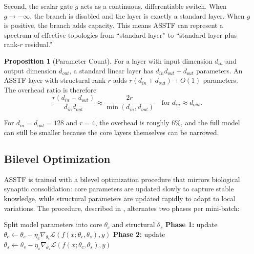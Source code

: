 \documentclass[11pt,a4paper]{article}
\theoremstyle{definition}
\newtheorem{proposition}{Proposition}[section]
\begin{document}
Second, the scalar gate $g$ acts as a continuous, differentiable switch. When $g \to -\infty$, the branch is disabled and the layer is exactly a standard layer. When $g$ is positive, the branch adds capacity. This means ASSTF can represent a spectrum of effective topologies from ``standard layer'' to ``standard layer plus rank-$r$ residual.''

\begin{proposition}[Parameter Count]
    \label{prop:params}
    For a layer with input dimension $d_{in}$ and output dimension $d_{out}$, a standard linear layer has $d_{in} d_{out} + d_{out}$ parameters. An ASSTF layer with structural rank $r$ adds $r(d_{in} + d_{out}) + O(1)$ parameters. The overhead ratio is therefore
    \begin{equation}
        \frac{r(d_{in} + d_{out})}{d_{in} d_{out}} \approx \frac{2r}{\min(d_{in}, d_{out})}
        \quad \text{for } d_{in} \approx d_{out}.
    \end{equation}
\end{proposition}

For $d_{in}=d_{out}=128$ and $r=4$, the overhead is roughly 6\%, and the full model can still be smaller because the core layers themselves can be narrowed.

\subsection{Bilevel Optimization}
\label{subsec:bilevel}

ASSTF is trained with a bilevel optimization procedure that mirrors biological synaptic consolidation: core parameters are updated slowly to capture stable knowledge, while structural parameters are updated rapidly to adapt to local variations. The procedure, described in \cite{lin2025asstf}, alternates two phases per mini-batch:

\begin{algorithm}[H]
\caption{ASSTF Bilevel Training (one epoch)}
\label{alg:bilevel}
\begin{algorithmic}[1]
\State Split model parameters into core $\theta_c$ and structural $\theta_s$
    \State \textbf{Phase 1:} update $\theta_c \leftarrow \theta_c - \eta_c \nabla_{\theta_c} \mathcal{L}(f(x; \theta_c, \theta_s), y)$
    \State \textbf{Phase 2:} update $\theta_s \leftarrow \theta_s - \eta_s \nabla_{\theta_s} \mathcal{L}(f(x; \theta_c, \theta_s), y)$
\EndFor
\end{algorithmic}
\end{algorithm}
\end{document}
